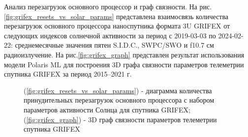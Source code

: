 \documentclass[12pt, a4paper]{extreport}
\begin{document}
Анализ перезагрузок основного процессор и граф связности. На рис.\ref{fig:grifex_resets_vs_solar_params} представлена взаимосвязь количества перезагрузок основного процессора наноспутника формата 3U GRIFEX от следующих индексов солнечной активности за период с 2019-03-03 по 2024-02-22: среднемесячные значения пятен S.I.D.C., SWPC/SWO и f10.7 см радиоизлучение. На рис.\ref{fig:grifex_graph} представлен результат использования модели Polaris ML для построения 3D графа связности параметров телеметрии спутника GRIFEX за период 2015–2021 г.

\begin{figure}[htbp]
    \centering
    \hfill %
    \caption{(\ref{fig:grifex_resets_vs_solar_params}) - диаграмма количества принудительных перезагрузок основного процессора с набором параметров активности Солнца для спутника GRIFEX; (\ref{fig:grifex_graph}) - 3D граф связности параметров телеметрии спутника GRIFEX}
    \label{fig:combined_figure}
\end{figure}
\end{document}
